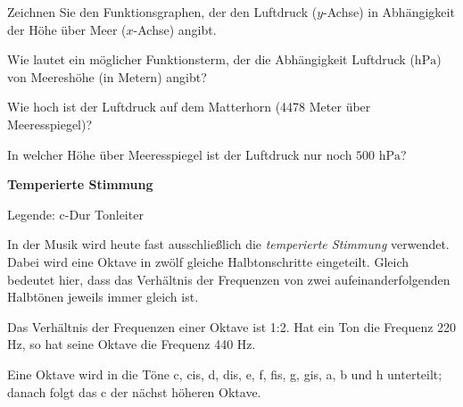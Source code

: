 \begin{bbwAufgabenBlock}

\item Zeichnen Sie den Funktionsgraphen, der den Luftdruck ($y$-Achse)
  in Abhängigkeit der Höhe über Meer ($x$-Achse) angibt.


\item Wie lautet ein möglicher Funktionsterm, der die Abhängigkeit
  Luftdruck ($\textrm{hPa}$) von Meereshöhe (in Metern) angibt?



\item Wie hoch ist der Luftdruck auf dem Matterhorn (4478 Meter über
  Meeresspiegel)?


\item In welcher Höhe über Meeresspiegel ist der Luftdruck nur noch
  $500 \textrm{ hPa}$?

  
\end{bbwAufgabenBlock}
\platzFuerBerechnungenBisEndeSeite{}



\bbwActAufgabenNr{} \textbf{Temperierte Stimmung}

\begin{center}Legende: c-Dur Tonleiter\end{center}


In der Musik wird heute fast ausschließlich die \textit{temperierte
  Stimmung} verwendet. Dabei wird eine Oktave in zwölf gleiche
Halbtonschritte eingeteilt. Gleich bedeutet hier, dass das Verhältnis
der Frequenzen von zwei aufeinanderfolgenden Halbtönen jeweils immer
gleich ist.

Das Verhältnis der Frequenzen einer Oktave ist 1:2. Hat ein Ton \zB
die Frequenz 220 Hz, so hat seine Oktave die Frequenz 440 Hz.

Eine Oktave wird in die Töne c, cis, d, dis, e, f, fis, g, gis, a, b und h
unterteilt; danach folgt das c der nächst höheren Oktave.

